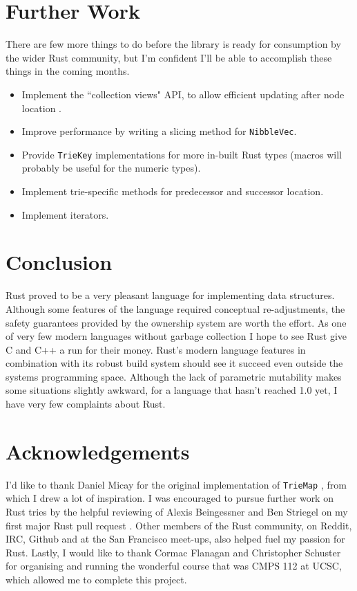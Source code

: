 \documentclass[a4paper,12pt]{article}
\newcommand{\code}[1]{\texttt{#1}}
\begin{document}
\section{Further Work}

There are few more things to do before the library is ready for consumption by the wider Rust community, but I'm confident I'll be able to accomplish these things in the coming months.

\begin{itemize}
\item Implement the ``collection views" API, to allow efficient updating after node location \cite{collection-views-rfc}.
\item Improve performance by writing a slicing method for \code{NibbleVec}.
\item Provide \code{TrieKey} implementations for more in-built Rust types (macros will probably be useful for the numeric types).
\item Implement trie-specific methods for predecessor and successor location.
\item Implement iterators.
\end{itemize}

\section{Conclusion}

Rust proved to be a very pleasant language for implementing data structures. Although some features of the language required conceptual re-adjustments, the safety guarantees provided by the ownership system are worth the effort. As one of very few modern languages without garbage collection I hope to see Rust give C and C++ a run for their money. Rust's modern language features in combination with its robust build system should see it succeed even outside the systems programming space. Although the lack of parametric mutability makes some situations slightly awkward, for a language that hasn't reached 1.0 yet, I have very few complaints about Rust.

\section{Acknowledgements}

I'd like to thank Daniel Micay for the original implementation of \code{TrieMap} \cite{original-trie-map}, from which I drew a lot of inspiration. I was encouraged to pursue further work on Rust tries by the helpful reviewing of Alexis Beingessner and Ben Striegel on my first major Rust pull request \cite{trie-map-entry-api}. Other members of the Rust community, on Reddit, IRC, Github and at the San Francisco meet-ups, also helped fuel my passion for Rust. Lastly, I would like to thank Cormac Flanagan and Christopher Schuster for organising and running the wonderful course that was CMPS 112 at UCSC, which allowed me to complete this project.
\end{document}
